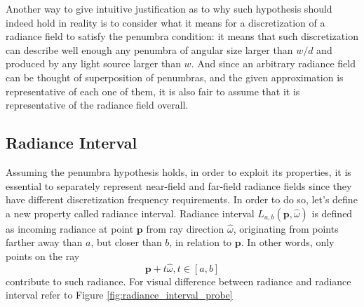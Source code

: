 \documentclass{jcgt}
\begin{document}
Another way to give intuitive justification as to why such hypothesis should indeed hold in reality is to consider what it means for a discretization of a radiance field to satisfy the penumbra condition: it means that
such discretization can describe well enough any penumbra of angular size larger than $w/d$ and produced by any light source larger than $w$. And since an arbitrary radiance field can be thought of
superposition of penumbras, and the given approximation is representative of each one of them, it is also fair to assume that it is representative of the radiance field overall.

\subsection{Radiance Interval}
Assuming the penumbra hypothesis holds, in order to exploit its properties, it is essential to separately represent near-field and far-field radiance fields since they have different
discretization frequency requirements. In order to do so, let's define a new property called radiance interval. Radiance interval $L_{a,b}(\textbf{p}, \hat \omega)$ is defined as incoming radiance at point $\textbf{p}$ from ray direction $\hat \omega$, originating from points farther away than $a$, but closer than $b$, in relation to $\textbf{p}$. In other words, only points on the ray
\begin{equation}
  \textbf{p} + t \hat \omega, t \in [a,b]
\end{equation}
contribute to such radiance. For visual difference between radiance and radiance interval refer to Figure \ref{fig:radiance_interval_probe}
\end{document}

